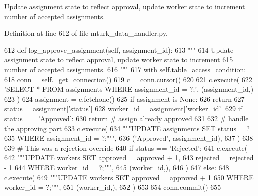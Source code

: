 \begin{DoxyVerb}Update assignment state to reflect approval, update worker state to increment
number of accepted assignments.
\end{DoxyVerb}
 

Definition at line 612 of file mturk\+\_\+data\+\_\+handler.\+py.


\begin{DoxyCode}
612     \textcolor{keyword}{def }log\_approve\_assignment(self, assignment\_id):
613         \textcolor{stringliteral}{"""}
614 \textcolor{stringliteral}{        Update assignment state to reflect approval, update worker state to increment}
615 \textcolor{stringliteral}{        number of accepted assignments.}
616 \textcolor{stringliteral}{        """}
617         with self.table\_access\_condition:
618             conn = self.\_get\_connection()
619             c = conn.cursor()
620 
621             c.execute(
622                 \textcolor{stringliteral}{'SELECT * FROM assignments WHERE assignment\_id = ?;'}, (assignment\_id,)
623             )
624             assignment = c.fetchone()
625             \textcolor{keywordflow}{if} assignment \textcolor{keywordflow}{is} \textcolor{keywordtype}{None}:
626                 \textcolor{keywordflow}{return}
627             status = assignment[\textcolor{stringliteral}{'status'}]
628             worker\_id = assignment[\textcolor{stringliteral}{'worker\_id'}]
629             \textcolor{keywordflow}{if} status == \textcolor{stringliteral}{'Approved'}:
630                 \textcolor{keywordflow}{return}  \textcolor{comment}{# assign already approved}
631 
632             \textcolor{comment}{# handle the approving part}
633             c.execute(
634                 \textcolor{stringliteral}{"""UPDATE assignments SET status = ?}
635 \textcolor{stringliteral}{                         WHERE assignment\_id = ?;"""},
636                 (\textcolor{stringliteral}{'Approved'}, assignment\_id),
637             )
638 
639             \textcolor{comment}{# This was a rejection override}
640             \textcolor{keywordflow}{if} status == \textcolor{stringliteral}{'Rejected'}:
641                 c.execute(
642                     \textcolor{stringliteral}{"""UPDATE workers SET approved = approved + 1,}
643 \textcolor{stringliteral}{                             rejected = rejected - 1}
644 \textcolor{stringliteral}{                             WHERE worker\_id = ?;"""},
645                     (worker\_id,),
646                 )
647             \textcolor{keywordflow}{else}:
648                 c.execute(
649                     \textcolor{stringliteral}{"""UPDATE workers SET approved = approved + 1}
650 \textcolor{stringliteral}{                             WHERE worker\_id = ?;"""},
651                     (worker\_id,),
652                 )
653 
654             conn.commit()
655 
\end{DoxyCode}
